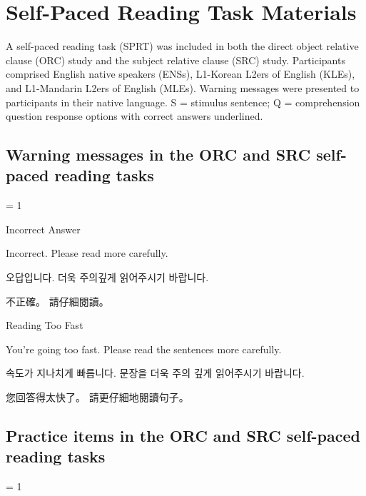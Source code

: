 
\chapter{Self-Paced Reading Task Materials}\label{app-materials-spr}

A self-paced reading task (SPRT) was included in both the direct object relative clause (ORC) study and the subject relative clause (SRC) study. Participants comprised English native speakers (ENSs), L1-Korean L2ers of English (KLEs), and L1-Mandarin L2ers of English (MLEs). Warning messages were presented to participants in their native language. S = stimulus sentence; Q = comprehension question response options with correct answers underlined.

\section{Warning messages in the ORC and SRC self-paced reading tasks}

\excnt = 1

\ex %
Incorrect Answer\par\nobreak
Incorrect. Please read more carefully.\par\nobreak
\ko 오답입니다. 더욱 주의깊게 읽어주시기 바랍니다.\normalfont\par\nobreak
\zh 不正確。 請仔細閱讀。\normalfont
\xe

\ex %
Reading Too Fast\par\nobreak
You're going too fast. Please read the sentences more carefully.\par\nobreak
\ko 속도가 지나치게 빠릅니다. 문장을 더욱 주의 깊게 읽어주시기 바랍니다.\normalfont\par\nobreak
\zh 您回答得太快了。 請更仔細地閱讀句子。\normalfont
\xe

\section{Practice items in the ORC and SRC self-paced reading tasks}

\excnt = 1

